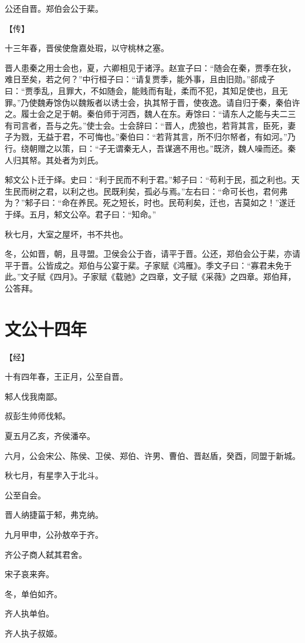 \documentclass[a4paper,12pt,UTF8,twoside]{ctexbook}
\begin{document}
公还自晋。郑伯会公于棐。

【传】

十三年春，晋侯使詹嘉处瑕，以守桃林之塞。

晋人患秦之用士会也，夏，六卿相见于诸浮。赵宣子曰：“随会在秦，贾季在狄，难日至矣，若之何？”中行桓子曰：“请复贾季，能外事，且由旧勋。”郤成子曰：“贾季乱，且罪大，不如随会，能贱而有耻，柔而不犯，其知足使也，且无罪。”乃使魏寿馀伪以魏叛者以诱士会，执其帑于晋，使夜逸。请自归于秦，秦伯许之。履士会之足于朝。秦伯师于河西，魏人在东。寿馀曰：“请东人之能与夫二三有司言者，吾与之先。”使士会。士会辞曰：“晋人，虎狼也，若背其言，臣死，妻子为戮，无益于君，不可悔也。”秦伯曰：“若背其言，所不归尔帑者，有如河。”乃行。绕朝赠之以策，曰：“子无谓秦无人，吾谋適不用也。”既济，魏人噪而还。秦人归其帑。其处者为刘氏。

邾文公卜迁于绎。史曰：“利于民而不利于君。”邾子曰：“苟利于民，孤之利也。天生民而树之君，以利之也。民既利矣，孤必与焉。”左右曰：“命可长也，君何弗为？”邾子曰：“命在养民。死之短长，时也。民苟利矣，迁也，吉莫如之！”遂迁于绎。五月，邾文公卒。君子曰：“知命。”

秋七月，大室之屋坏，书不共也。

冬，公如晋，朝，且寻盟。卫侯会公于沓，请平于晋。公还，郑伯会公于棐，亦请平于晋。公皆成之。郑伯与公宴于棐。子家赋《鸿雁》。季文子曰：“寡君未免于此。”文子赋《四月》。子家赋《载驰》之四章，文子赋《采薇》之四章。郑伯拜，公答拜。


\chapter{文公十四年}


【经】

十有四年春，王正月，公至自晋。

邾人伐我南鄙。

叔彭生帅师伐邾。

夏五月乙亥，齐侯潘卒。

六月，公会宋公、陈侯、卫侯、郑伯、许男、曹伯、晋赵盾，癸酉，同盟于新城。

秋七月，有星孛入于北斗。

公至自会。

晋人纳捷菑于邾，弗克纳。

九月甲申，公孙敖卒于齐。

齐公子商人弑其君舍。

宋子哀来奔。

冬，单伯如齐。

齐人执单伯。

齐人执子叔姬。
\end{document}
